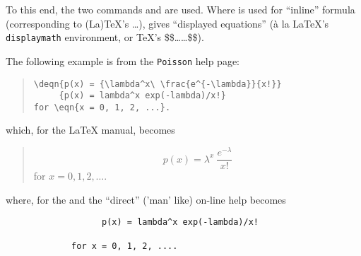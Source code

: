 To this end, the two commands 
and  are used.  Where 
is used for ``inline'' formula (corresponding to (La)\TeX{}'s \ldots{}),
 gives ``displayed equations'' ({\`a} la \LaTeX{}'s
\texttt{displaymath} environment, or \TeX{}'s \$\$\ldots\ldots\$\$).

The following example is from the \texttt{Poisson} help page:
\begin{quote}
\begin{verbatim}
\deqn{p(x) = {\lambda^x\ \frac{e^{-\lambda}}{x!}}
     {p(x) = lambda^x exp(-lambda)/x!}
for \eqn{x = 0, 1, 2, ...}.
\end{verbatim}
\end{quote}
which, for the \LaTeX{} manual, becomes
\begin{quote}
  \[ p(x) = \lambda^x\ \frac{e^{-\lambda}}{x!}  \]
  for $ x = 0, 1, 2, \ldots $.
\end{quote}
where, for the \HTML{} and the ``direct'' ('man' like) on-line help
becomes
\begin{verbatim}
                   p(x) = lambda^x exp(-lambda)/x!
        
             for x = 0, 1, 2, ....
\end{verbatim}
        
